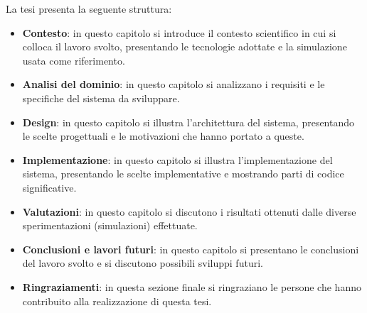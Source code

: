 
La tesi presenta la seguente struttura:
\begin{itemize}
    \item \textbf{Contesto}: in questo capitolo si introduce il contesto scientifico in cui si colloca il lavoro svolto,
    presentando le tecnologie adottate e la simulazione usata come riferimento.
    \item \textbf{Analisi del dominio}: in questo capitolo si analizzano i requisiti e le specifiche del sistema da sviluppare.
    \item \textbf{Design}: in questo capitolo si illustra l'architettura del sistema, presentando le scelte progettuali e le motivazioni che hanno portato a queste.
    \item \textbf{Implementazione}: in questo capitolo si illustra l'implementazione del sistema, presentando le scelte implementative e mostrando parti di codice significative.
    \item \textbf{Valutazioni}: in questo capitolo si discutono i risultati ottenuti dalle diverse sperimentazioni (simulazioni) effettuate.
    \item \textbf{Conclusioni e lavori futuri}: in questo capitolo si presentano le conclusioni del lavoro svolto e si discutono possibili sviluppi futuri.
    \item \textbf{Ringraziamenti}: in questa sezione finale si ringraziano le persone che hanno contribuito alla realizzazione di questa tesi.
\end{itemize}